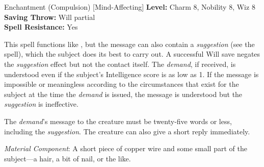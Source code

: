 {Enchantment (Compulsion) [Mind-Affecting]}
{
	\textbf{Level:}
	Charm 8, Nobility 8, Wiz 8\\
	\textbf{Saving Throw:}
	Will partial\\
	\textbf{Spell Resistance:}
	Yes\\
}
{
	This spell functions like , but the message can also contain a \emph{suggestion} (see the  spell), which the subject does its best to carry out. A successful Will save negates the \emph{suggestion} effect but not the contact itself. The \emph{demand}, if received, is understood even if the subject's Intelligence score is as low as 1. If the message is impossible or meaningless according to the circumstances that exist for the subject at the time the \emph{demand} is issued, the message is understood but the \emph{suggestion} is ineffective.

	The \emph{demand}'s message to the creature must be twenty-five words or less, including the \emph{suggestion}. The creature can also give a short reply immediately.

	\textit{Material Component}:
	A short piece of copper wire and some small part of the subject---a hair, a bit of nail, or the like.

}
